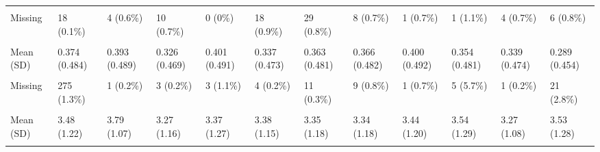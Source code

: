 \documentclass[
  single column]{article}
\begin{document}
\begin{landscape}
\begin{longtable}[t]{llllllllllll}
\cellcolor{gray!10}{Median [Min, Max]} & \cellcolor{gray!10}{2.33 [1.00, 7.00]} & \cellcolor{gray!10}{2.80 [1.00, 7.00]} & \cellcolor{gray!10}{1.80 [1.00, 7.00]} & \cellcolor{gray!10}{2.50 [1.00, 7.00]} & \cellcolor{gray!10}{2.00 [1.00, 7.00]} & \cellcolor{gray!10}{1.80 [1.00, 7.00]} & \cellcolor{gray!10}{2.00 [1.00, 7.00]} & \cellcolor{gray!10}{2.40 [1.00, 5.67]} & \cellcolor{gray!10}{2.30 [1.00, 6.20]} & \cellcolor{gray!10}{2.00 [1.00, 6.60]} & \cellcolor{gray!10}{2.60 [1.00, 7.00]}\\
Missing & 18 (0.1\%) & 4 (0.6\%) & 10 (0.7\%) & 0 (0\%) & 18 (0.9\%) & 29 (0.8\%) & 8 (0.7\%) & 1 (0.7\%) & 1 (1.1\%) & 4 (0.7\%) & 6 (0.8\%)\\
\addlinespace
\cellcolor{gray!10}{Male (Yes/No)} & \cellcolor{gray!10}{} & \cellcolor{gray!10}{} & \cellcolor{gray!10}{} & \cellcolor{gray!10}{} & \cellcolor{gray!10}{} & \cellcolor{gray!10}{} & \cellcolor{gray!10}{} & \cellcolor{gray!10}{} & \cellcolor{gray!10}{} & \cellcolor{gray!10}{} & \cellcolor{gray!10}{}\\
Mean (SD) & 0.374 (0.484) & 0.393 (0.489) & 0.326 (0.469) & 0.401 (0.491) & 0.337 (0.473) & 0.363 (0.481) & 0.366 (0.482) & 0.400 (0.492) & 0.354 (0.481) & 0.339 (0.474) & 0.289 (0.454)\\
\cellcolor{gray!10}{Median [Min, Max]} & \cellcolor{gray!10}{0 [0, 1.00]} & \cellcolor{gray!10}{0 [0, 1.00]} & \cellcolor{gray!10}{0 [0, 1.00]} & \cellcolor{gray!10}{0 [0, 1.00]} & \cellcolor{gray!10}{0 [0, 1.00]} & \cellcolor{gray!10}{0 [0, 1.00]} & \cellcolor{gray!10}{0 [0, 1.00]} & \cellcolor{gray!10}{0 [0, 1.00]} & \cellcolor{gray!10}{0 [0, 1.00]} & \cellcolor{gray!10}{0 [0, 1.00]} & \cellcolor{gray!10}{0 [0, \vphantom{1} 1.00]}\\
Missing & 275 (1.3\%) & 1 (0.2\%) & 3 (0.2\%) & 3 (1.1\%) & 4 (0.2\%) & 11 (0.3\%) & 9 (0.8\%) & 1 (0.7\%) & 5 (5.7\%) & 1 (0.2\%) & 21 (2.8\%)\\
\cellcolor{gray!10}{Neuroticism (Personality Trait)} & \cellcolor{gray!10}{} & \cellcolor{gray!10}{} & \cellcolor{gray!10}{} & \cellcolor{gray!10}{} & \cellcolor{gray!10}{} & \cellcolor{gray!10}{} & \cellcolor{gray!10}{} & \cellcolor{gray!10}{} & \cellcolor{gray!10}{} & \cellcolor{gray!10}{} & \cellcolor{gray!10}{}\\
\addlinespace
Mean (SD) & 3.48 (1.22) & 3.79 (1.07) & 3.27 (1.16) & 3.37 (1.27) & 3.38 (1.15) & 3.35 (1.18) & 3.34 (1.18) & 3.44 (1.20) & 3.54 (1.29) & 3.27 (1.08) & 3.53 (1.28)\\
\cellcolor{gray!10}{Median [Min, Max]} & \cellcolor{gray!10}{3.50 [1.00, 7.00]} & \cellcolor{gray!10}{3.75 [1.00, 7.00]} & \cellcolor{gray!10}{3.25 [1.00, 7.00]} & \cellcolor{gray!10}{3.25 [1.00, 7.00]} & \cellcolor{gray!10}{3.25 [1.00, 7.00]} & \cellcolor{gray!10}{3.25 [1.00, 7.00]} & \cellcolor{gray!10}{3.25 [1.00, 7.00]} & \cellcolor{gray!10}{3.29 [1.00, 7.00]} & \cellcolor{gray!10}{3.50 [1.00, 6.50]} & \cellcolor{gray!10}{3.25 [1.00, 7.00]} & \cellcolor{gray!10}{3.50 [1.00, 7.00]}\\

\end{longtable}
\end{landscape}
\end{document}
